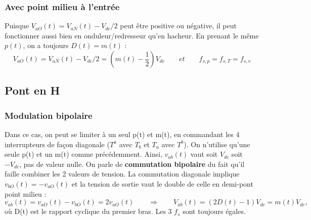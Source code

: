		\subsubsection{Avec point milieu à l'entrée}
			Puisque $V_{aO}(t) = V_{aN}(t) - V_{dc}/2$ peut être positive ou négative, il peut fonctionner aussi bien en onduleur/redresseur qu'en hacheur. En prenant le même $p(t)$, on a toujours $D(t) = m(t)$ :
			\begin{equation}
				V_{aO}(t) = V_{aN}(t) - V_{dc}/2 = (m(t) - \frac{1}{2})V_{dc} \qquad et \qquad f_{s,p} = f_{s,T} =f_{s,v}
			\end{equation}
			
	\subsection{Pont en H}
		\subsubsection{Modulation bipolaire}
			Dans ce cas, on peut se limiter à un seul p(t) et m(t), en commandant les 4 interrupteurs de façon diagonale ($T^a$ avec $T_b$ et $T_a$ avec $T^b$). On n'utilise qu'une seule p(t) et un m(t) comme précédemment. Ainsi, $v_{ab}(t)$ vaut soit $V_{dc}$ soit $-V_{dc}$, pas de valeur nulle. On parle de \textbf{commutation bipolaire} du fait qu'il faille combiner les 2 valeurs de tension. La commutation diagonale implique $v_{bO}(t) = - v_{aO}(t)$ et la tension de sortie vaut le double de celle en demi-pont point milieu :
			\begin{equation}
				v_{ab}(t) = v_{aO}(t)-v_{bO}(t) = 2v_{aO}(t) \qquad \Rightarrow \qquad V_{ab}(t) = (2D(t)-1)V_{dc} = m(t) V_{dc},
			\end{equation}
			où D(t) est le rapport cyclique du premier bras. Les 3 $f_s$ sont toujours égales.
			
